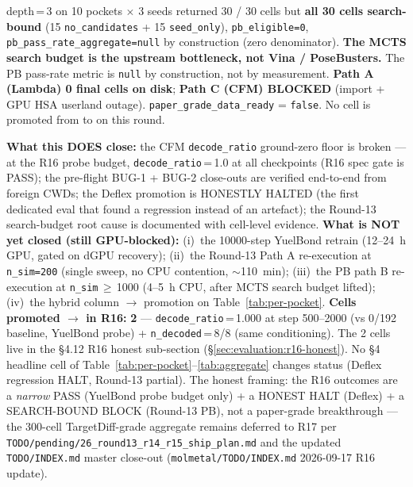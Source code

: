 \begin{enumerate}
\begin{itemize}
          depth\,=\,3 on 10 pockets $\times$ 3 seeds returned
          30 / 30 cells but \textbf{all 30 cells search-bound}
          (15 \texttt{no\_candidates} + 15 \texttt{seed\_only}),
          \texttt{pb\_eligible=0},
          \texttt{pb\_pass\_rate\_aggregate=null} by construction
          (zero denominator). \textbf{The MCTS search budget is the
          upstream bottleneck, not Vina / PoseBusters.} The
          PB pass-rate metric is \texttt{null} by construction,
          not by measurement. \textbf{Path A (Lambda) 0 final
          cells on disk}; \textbf{Path C (CFM) BLOCKED} (import +
          GPU HSA userland outage).
          \texttt{paper\_grade\_data\_ready} = \texttt{false}. No
          cell is promoted from \DESIGN{} to \MEASURED{} on this
          round.
  \end{itemize}
  \textbf{What this DOES close:} the CFM \texttt{decode\_ratio}
  ground-zero floor is broken --- at the R16 probe budget,
  \texttt{decode\_ratio}\,=\,1.0 at all checkpoints (R16 spec
  gate is PASS); the pre-flight BUG-1 + BUG-2 close-outs are
  verified end-to-end from foreign CWDs; the Deflex promotion
  is HONESTLY HALTED (the first dedicated eval that found a
  regression instead of an artefact); the Round-13 search-budget
  root cause is documented with cell-level evidence.
  \textbf{What is NOT yet closed (still GPU-blocked):}
  (i)~the 10000-step YuelBond retrain (12--24~h GPU, gated on
  dGPU recovery); (ii)~the Round-13 Path A re-execution at
  \texttt{n\_sim=200} (single sweep, no CPU contention, $\sim$110~min);
  (iii)~the PB path B re-execution at
  \texttt{n\_sim}\,$\geq$\,1000 (4--5~h CPU, after MCTS search
  budget lifted); (iv)~the hybrid column \DESIGN{} $\to$
  \MEASURED{} promotion on Table~\ref{tab:per-pocket}.
  \textbf{Cells promoted \DESIGN{} $\to$ \MEASURED{} in R16:} \textbf{2}
  --- \texttt{decode\_ratio}\,=\,1.000 at step 500--2000 (vs 0/192
  baseline, YuelBond probe) + \texttt{n\_decoded}\,=\,8/8 (same
  conditioning). The 2 cells live in the §4.12 R16 honest sub-section
  (\S\ref{sec:evaluation:r16-honest}). No §4 headline cell of
  Table~\ref{tab:per-pocket}--\ref{tab:aggregate} changes status
  (Deflex regression HALT, Round-13 partial). The honest framing:
  the R16 outcomes are a \emph{narrow} PASS (YuelBond probe budget
  only) + a HONEST HALT (Deflex) + a SEARCH-BOUND BLOCK (Round-13
  PB), not a paper-grade breakthrough --- the 300-cell TargetDiff-grade
  aggregate remains deferred to R17 per
  \texttt{TODO/pending/26\_round13\_r14\_r15\_ship\_plan.md} and
  the updated \texttt{TODO/INDEX.md} master close-out
  (\texttt{molmetal/TODO/INDEX.md} 2026-09-17 R16 update).


\end{enumerate}
